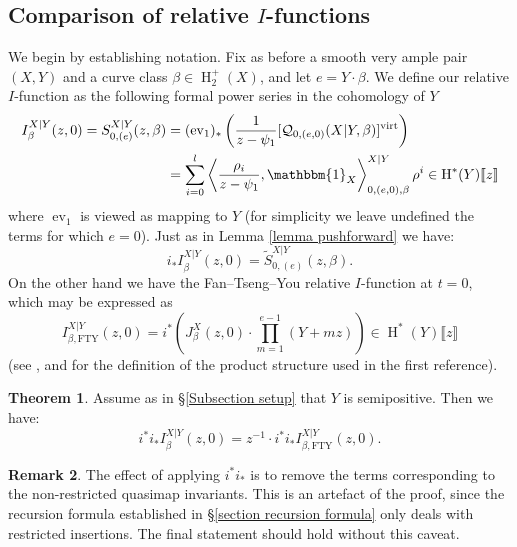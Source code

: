 \documentclass[10pt]{amsart}
\newcommand{\Q}[4]{\mathcal{Q}_{#1,#2}(#3,#4)}
\newcommand{\virt}[1]{[#1]^{\operatorname{virt}}}
\newcommand{\HH}{\operatorname{H}}
\newcommand{\ev}{\operatorname{ev}}
\theoremstyle{definition}
\newtheorem{thm}{Theorem}[section]
\theoremstyle{definition}
\newtheorem{remark}[thm]{Remark}
\begin{document}
\subsection{Comparison of relative $I$-functions} We begin by establishing notation. Fix as before a smooth very ample pair $(X,Y)$ and a curve class $\beta \in \HH_2^+(X)$, and let $e=Y\cdot \beta$. We define our relative $I$-function as the following formal power series in the cohomology of $Y$
\begin{align*} I^{X|Y}_\beta(z,0) = S_{0,(e)}^{X|Y}(z,\beta) & = (\ev_1)_*\left( \frac{1}{z-\psi_1}\virt{\Q{0}{(e,0)}{X|Y}{\beta}}\right) \\
& = \sum_{i=0}^l \left\langle \dfrac{\rho_i}{z- \psi_1}, \mathbbm{1}_X \right\rangle^{X|Y}_{0,(e,0),\beta} \rho^i \in \HH^*(Y)\llbracket z \rrbracket \end{align*}
where $\ev_1$ is viewed as mapping to $Y$ (for simplicity we leave undefined the terms for which $e=0$). Just as in Lemma \ref{lemma pushforward} we have:
\begin{equation*} i_* I_\beta^{X|Y}(z,0) = \widetilde{S}_{0,(e)}^{X|Y}(z,\beta).\end{equation*}
On the other hand we have the Fan--Tseng--You relative $I$-function at $t=0$, which may be expressed as
\begin{equation*} I_{\beta,\mathrm{FTY}}^{X|Y}(z,0) = i^* \left( J^X_{\beta}(z,0) \cdot \prod_{m=1}^{e-1}(Y+mz) \right) \in \HH^*(Y)\llbracket z \rrbracket\end{equation*}
(see \cite[Theorem 4.3]{FanTsengYou}, and \cite[\S 7.1]{FanWuYou} for the definition of the product structure used in the first reference).
\begin{thm} \label{wallcrossing thm} Assume as in \S \ref{Subsection setup} that $Y$ is semipositive. Then we have:
\begin{equation*} i^* i_* I_\beta^{X|Y}(z,0) = z^{-1}\cdot i^* i_* I_{\beta,\mathrm{FTY}}^{X|Y}(z,0).\end{equation*}
\end{thm}
\begin{remark} The effect of applying $i^* i_*$ is to remove the terms corresponding to the non-restricted quasimap invariants. This is an artefact of the proof, since the recursion formula established in \S \ref{section recursion formula} only deals with restricted insertions. The final statement should hold without this caveat.\end{remark}
\end{document}
